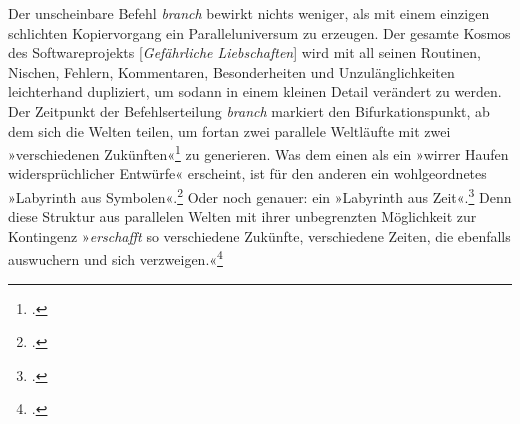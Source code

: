 \documentclass[a4paper,12pt]{article}
\newcommand{\anf}[1]{»#1«}
\begin{document}
Der unscheinbare Befehl \emph{branch} bewirkt nichts weniger, als mit einem einzigen schlichten Kopiervorgang ein Paralleluniversum zu erzeugen. Der gesamte Kosmos des Softwareprojekts [\emph{Gefährliche Liebschaften}] wird mit all seinen Routinen, Nischen, Fehlern, Kommentaren, Besonderheiten und Unzulänglichkeiten leichterhand dupliziert, um sodann in einem kleinen Detail verändert zu werden. Der Zeitpunkt der Befehlserteilung \emph{branch} markiert den Bifurkationspunkt, ab dem sich die Welten teilen, um fortan zwei parallele Weltläufte mit zwei \anf{verschiedenen Zukünften}\footcite[169]{borges:1941} zu generieren. Was dem einen als ein \anf{wirrer Haufen widersprüchlicher Entwürfe} erscheint, ist für den anderen ein wohlgeordnetes \anf{Labyrinth aus Symbolen}.\footcite[168]{borges:1941} Oder noch genauer: ein \anf{Labyrinth aus Zeit}.\footcite[168]{borges:1941} Denn diese Struktur aus parallelen Welten mit ihrer unbegrenzten Möglichkeit zur Kontingenz \anf{\emph{erschafft} so verschiedene Zukünfte, verschiedene Zeiten, die ebenfalls auswuchern und sich verzweigen.}\footcite[170]{borges:1941} 
\end{document}
